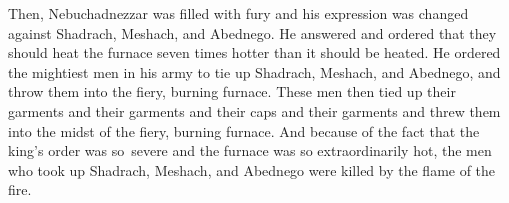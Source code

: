 \begin{inparaenum}
     Then, Nebuchadnezzar was filled with fury and his expression was changed against Shadrach, Meshach, and Abednego. He answered and ordered that they should heat the furnace seven times hotter than it should be heated.%
     He ordered the mightiest men in his army to tie up Shadrach, Meshach, and Abednego, and throw them into the fiery, burning furnace.%
     These men then tied up their garments and their garments and their caps and their garments and threw them into the midst of the fiery, burning furnace.%
     And because of the fact that the king's order was so\understood\ severe and the furnace was so extraordinarily hot, the men who took up Shadrach, Meshach, and Abednego were killed by the flame of the fire.%
    
    
    
\end{inparaenum}
